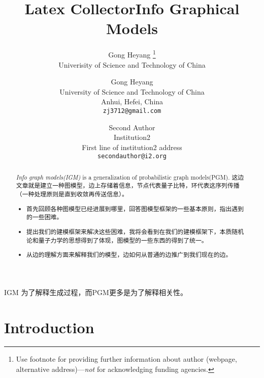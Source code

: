 \documentclass{article}
\title{{Latex Collector}}
\author{
   Gong Heyang \thanks{Use footnote for providing further
    information about author (webpage, alternative
    address)---\emph{not} for acknowledging funding agencies.} \\
    Univerisity of Science and Technology of China \\
}
\theoremstyle{definition}
\theoremstyle{remark}
\theoremstyle{definition}
\begin{document}
\begin{CJK*}{UTF8}{gbsn}

\title{Info Graphical Models}

\author{Gong Heyang\\
University of Science and Technology of China\\
Anhui, Hefei, China\\
{\tt\small zj3712@gmail.com}
\and
Second Author\\
Institution2\\
First line of institution2 address\\
{\tt\small secondauthor@i2.org}
}

\maketitle

\begin{abstract}
    \emph{Info graph models(IGM)} is a generalization of probabilistic graph models(PGM). 这边文章就是建立一种图模型，边上存储着信息，节点代表量子比特，环代表这序列传播（一种处理原则是直到收敛再传送信息）。 
    \begin{itemize}
        \item 首先回顾各种图模型已经进展到哪里，回答图模型框架的一些基本原则，指出遇到的一些困难。 
        \item 提出我们的建模框架来解决这些困难，我将会看到在我们的建模框架下，本质随机论和量子力学的思想得到了体现，图模型的一些东西的得到了统一。
        \item 从边的理解方面来解释我们的模型，边如何从普通的边推广到我们现在的边。
    \end{itemize}
\end{abstract}

IGM 为了解释生成过程，而PGM更多是为了解释相关性。

\tableofcontents

\section{Introduction}




\end{CJK*}
\end{document}
